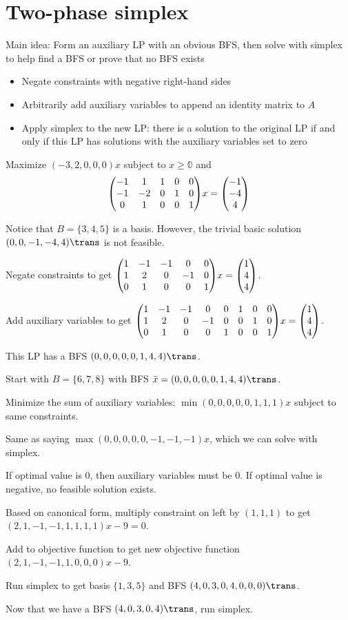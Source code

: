 \section{Two-phase simplex}

Main idea: Form an auxiliary LP with an obvious BFS, then solve with simplex to
help find a BFS or prove that no BFS exists
\begin{itemize}[nosep]
  \item Negate constraints with negative right-hand sides
  \item Arbitrarily add auxiliary variables to append an identity matrix
        to $A$
  \item Apply simplex to the new LP: there is a solution to the original
        LP if and only if this LP has solutions with the auxiliary
        variables set to zero
\end{itemize}

\begin{example}
  Maximize $(-3,2,0,0,0)x$ subject to
  $x \geq \mathbb0$ and
  \[\mqty(\mqty{-1&1\\-1&-2\\0&1}&\mqty{\imat{3}})x = \mqty(-1\\-4\\4)\]
\end{example}
\begin{sol}
  Notice that $B = \{3,4,5\}$ is a basis.
  However, the trivial basic solution $(0,0,-1,-4,4)\trans$ is not feasible.

  Negate constraints to get
  $\mqty(\mqty{1&-1&-1&0&0\\1&2&0&-1&0\\0&1&0&0&1})x = \mqty(1\\4\\4)$.

  Add auxiliary variables to get
  $\mqty(\mqty{1&-1&-1&0&0\\1&2&0&-1&0\\0&1&0&0&1}&\mqty{\imat{3}})x = \mqty(1\\4\\4)$.

  This LP has a BFS $(0,0,0,0,0,1,4,4)\trans$.

  Start with $B = \{6,7,8\}$ with BFS
  $\bar x = (0,0,0,0,0,1,4,4)\trans$.

  Minimize the sum of auxiliary variables:
  $\min{(0,0,0,0,0,1,1,1)x}$ subject to same constraints.

  Same as saying $\max{(0,0,0,0,0,-1,-1,-1)x}$, which we can solve
  with simplex.

  If optimal value is 0, then auxiliary variables must be 0.
  If optimal value is negative, no feasible solution exists.

  Based on canonical form, multiply constraint on left by $(1,1,1)$
  to get $(2,1,-1,-1,1,1,1,1)x-9=0$.

  Add to objective function to get new objective function
  $(2,1,-1,-1,1,0,0,0)x-9$.

  Run simplex to get basis $\{1,3,5\}$ and BFS
  $(4,0,3,0,4,0,0,0)\trans$.

  Now that we have a BFS $(4,0,3,0,4)\trans$, run simplex.
\end{sol}

